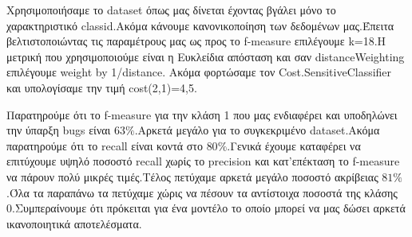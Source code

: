 Χρησιμοποιήσαμε το dataset όπως μας δίνεται έχοντας βγάλει μόνο το χαρακτηριστικό classid.Ακόμα κάνουμε κανονικοποίηση των δεδομένων μας.Έπειτα βελτιστοποιώντας τις παραμέτρους μας ως προς το f-measure επιλέγουμε k=18.Η μετρική που χρησιμοποιούμε είναι η Ευκλείδια απόσταση και σαν distanceWeighting επιλέγουμε weight by 1/distance. Ακόμα φορτώσαμε τον Cost.SensitiveClassifier και υπολογίσαμε την τιμή cost(2,1)=4,5.

Παρατηρούμε ότι το f-measure για την κλάση 1 που μας ενδιαφέρει και υποδηλώνει την ύπαρξη bugs είναι $63\%$.Αρκετά μεγάλο για το συγκεκριμένο dataset.Ακόμα παρατηρούμε ότι το recall είναι κοντά στο $80\%$.Γενικά έχουμε καταφέρει να επιτύχουμε υψηλό ποσοστό recall χωρίς το precision και κατ'επέκταση το f-measure να πάρουν πολύ μικρές τιμές.Τέλος πετύχαμε αρκετά μεγάλο ποσοστό ακρίβειας $81\%$.Όλα τα παραπάνω τα πετύχαμε χώρις να πέσουν τα αντίστοιχα ποσοστά της κλάσης 0.Συμπεραίνουμε ότι πρόκειται για ένα μοντέλο το οποίο μπορεί να μας δώσει αρκετά ικανοποιητικά αποτελέσματα.